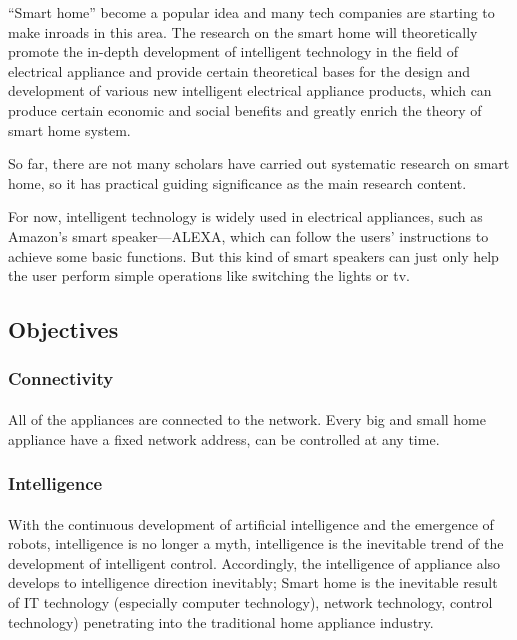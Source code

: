 \documentclass[a4paper,12pt]{article}
\begin{document}
“Smart home” become a popular idea and many tech companies are starting to make inroads in this area. The research on the smart home will theoretically promote the in-depth development of intelligent technology in the field of electrical appliance and provide certain theoretical bases for the design and development of various new intelligent electrical appliance products, which can produce certain economic and social benefits and greatly enrich the theory of smart home system. \\\par

So far, there are not many scholars have carried out systematic research on smart home, so it has practical guiding significance as the main research content. \\\par

For now, intelligent technology is widely used in electrical appliances, such as Amazon’s smart speaker---ALEXA, which can follow the users’ instructions to achieve some basic functions. But this kind of smart speakers can just only help the user perform simple operations like switching the lights or tv. \\

\subsection{Objectives}

\subsubsection{Connectivity}
\paragraph{}
All of the appliances are connected to the network. Every big and small home appliance have a fixed network address, can be controlled at any time. \\\par

\subsubsection{Intelligence}
\paragraph{}
With the continuous development of artificial intelligence and the emergence of robots, intelligence is no longer a myth, intelligence is the inevitable trend of the development of intelligent control. Accordingly, the intelligence of appliance also develops to intelligence direction inevitably; Smart home is the inevitable result of IT technology (especially computer technology), network technology, control technology) penetrating into the traditional home appliance industry. \\\par
\end{document}
